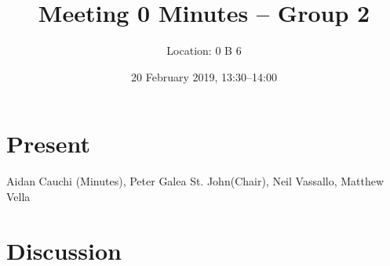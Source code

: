 \documentclass[11pt,a4paper]{article}
\title{Meeting 0 Minutes -- Group 2}
\author{Location: 0 B 6}
\date{20 February 2019, 13:30--14:00}
\begin{document}
\maketitle

\section*{Present}
Aidan Cauchi (Minutes),
Peter Galea St. John(Chair),
Neil Vassallo,
Matthew Vella

%

\section*{Discussion}
\end{document}
